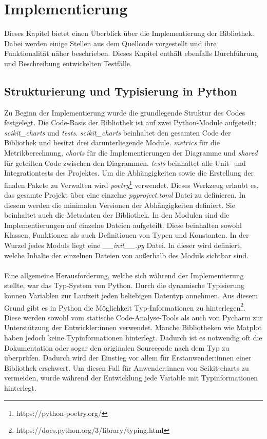 \chapter{Implementierung}
\label{cha:implementierung}

Dieses Kapitel bietet einen Überblick über die Implementierung der Bibliothek. Dabei werden einige Stellen aus dem Quellcode vorgestellt und ihre Funktionalität näher beschrieben. Dieses Kapitel enthält ebenfalls Durchführung und Beschreibung entwickelten Testfälle.

\section{Strukturierung und Typisierung in Python}
\label{sec:impl_structure_problems}

Zu Beginn der Implementierung wurde die grundlegende Struktur des Codes festgelegt. Die Code-Basis der Bibliothek ist auf zwei Python-Module aufgeteilt: \emph{scikit\_charts} und \emph{tests}. \emph{scikit\_charts} beinhaltet den gesamten Code der Bibliothek und besitzt drei darunterliegende Module. \emph{metrics} für die Metrikberechnung, \emph{charts} für die Implementierungen der Diagramme und \emph{shared} für geteilten Code zwischen den Diagrammen. \emph{tests} beinhaltet alle Unit- und Integrationtests des Projektes. Um die Abhängigkeiten sowie die Erstellung der finalen Pakete zu Verwalten wird \emph{poetry}\footnote{https://python-poetry.org/} verwendet. Dieses Werkzeug erlaubt es, das gesamte Projekt über eine einzelne \emph{pyproject.toml} Datei zu definieren. In diesem werden die minimalen Versionen der Abhängigkeiten definiert. Sie beinhaltet auch die Metadaten der Bibliothek. In den Modulen sind die Implementierungen auf einzelne Dateien aufgeteilt. Diese beinhalten sowohl Klassen, Funktionen als auch Definitionen von Typen und Konstanten. In der Wurzel jedes Moduls liegt eine \emph{\_\_init\_\_.py} Datei. In dieser wird definiert, welche Inhalte der einzelnen Dateien von außerhalb des Moduls sichtbar sind.\\\\
\noindent Eine allgemeine Herausforderung, welche sich während der Implementierung stellte, war das Typ-System von Python. Durch die dynamische Typisierung können Variablen zur Laufzeit jeden beliebigen Datentyp annehmen. Aus diesem Grund gibt es in Python die Möglichkeit Typ-Informationen zu hinterlegen\footnote{https://docs.python.org/3/library/typing.html}. Diese werden sowohl vom statische Code-Analyse-Tools als auch von Pycharm zur Unterstützung der Entwickler:innen verwendet. Manche Bibliotheken wie Matplot haben jedoch keine Typinformationen hinterlegt. Dadurch ist es notwendig oft die Dokumentation oder sogar den originalen Sourcecode nach dem Typ zu überprüfen. Dadurch wird der Einstieg vor allem für Erstanwender:innen einer Bibliothek erschwert. Um diesen Fall für Anwender:innen von Scikit-charts zu vermeiden, wurde während der Entwicklung jede Variable mit Typinformationen hinterlegt.

